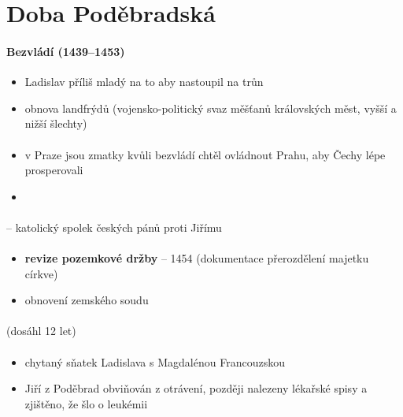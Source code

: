 \section{Doba Poděbradská}
\paragraph{Bezvládí (1439--1453)} 
\begin{itemize}
\item Ladislav příliš mladý na to aby nastoupil na trůn
\item obnova landfrýdů (vojensko-politický svaz měšťanů královských měst, vyšší a nižší šlechty)
\end{itemize}

\paragraph{}
\begin{itemize}
\item v Praze jsou zmatky kvůli bezvládí \ra chtěl ovládnout Prahu, aby Čechy lépe prosperovali
\item {}
\end{itemize}
\paragraph{} -- katolický spolek českých pánů proti Jiřímu

\paragraph{}
\begin{itemize}
\item \textbf{revize pozemkové držby} -- 1454 (dokumentace přerozdělení majetku církve)
\item obnovení zemského soudu
\end{itemize}

\paragraph{} (dosáhl 12 let)

\paragraph{}
\begin{itemize}
\item chytaný sňatek Ladislava s Magdalénou Francouzskou
\item Jiří z Poděbrad obviňován z otrávení, později nalezeny lékařské spisy a zjištěno, že šlo o leukémii
\end{itemize}

